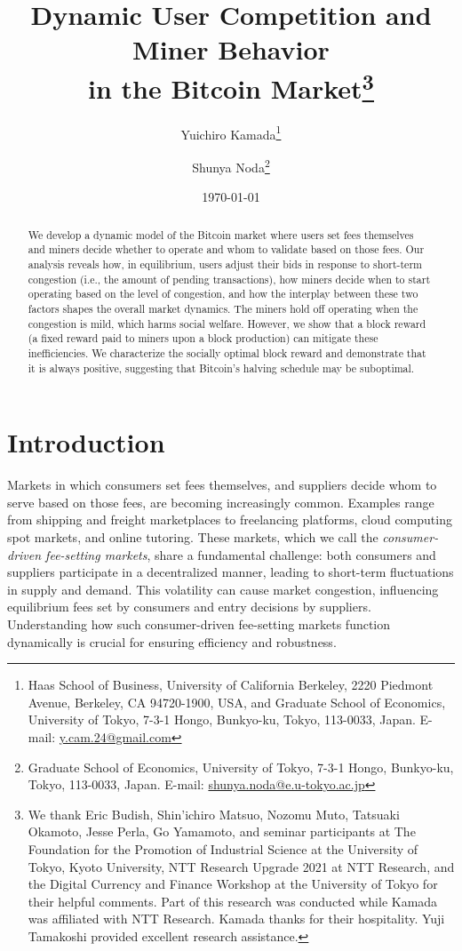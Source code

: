 \documentclass[12pt, letterpaper]{article}
\title{Dynamic User Competition and Miner Behavior\\ in the Bitcoin Market\thanks{We thank Eric Budish, Shin'ichiro Matsuo, Nozomu Muto, Tatsuaki Okamoto, Jesse Perla, Go Yamamoto, and seminar participants at 
The Foundation for the Promotion of Industrial Science at the University of Tokyo, Kyoto University, NTT Research Upgrade 2021 at NTT Research, and the Digital Currency and Finance Workshop at the University of Tokyo 
for their helpful comments. 
Part of this research was conducted while Kamada was affiliated with NTT Research. Kamada thanks for their hospitality. Yuji Tamakoshi provided excellent research assistance.}}
\date{\today}
\author{Yuichiro Kamada\footnote{Haas School of Business, University of California Berkeley, 2220 Piedmont Avenue, Berkeley, CA
94720-1900, USA, and Graduate School of Economics, University of Tokyo, 7-3-1 Hongo, Bunkyo-ku, Tokyo,
113-0033, Japan. E-mail: \href{mailto:y.cam.24@gmail.com}{y.cam.24@gmail.com}} \and Shunya Noda\footnote{Graduate School of Economics, University of Tokyo, 7-3-1 Hongo, Bunkyo-ku, Tokyo, 113-0033, Japan. E-mail: \href{mailto:shunya.noda@e.u-tokyo.ac.jp}{shunya.noda@e.u-tokyo.ac.jp}}}
\begin{document}
\onehalfspacing

\maketitle

\begin{abstract}
We develop a dynamic model of the Bitcoin market where users set fees themselves and miners decide whether to operate and whom to validate based on those fees. Our analysis reveals how, in equilibrium, users adjust their bids in response to short-term congestion (i.e., the amount of pending transactions), how miners decide when to start operating based on the level of congestion, and how the interplay between these two factors shapes the overall market dynamics. The miners hold off operating when the congestion is mild, which harms social welfare. However, we show that a block reward (a fixed reward paid to miners upon a block production) can mitigate these inefficiencies. We characterize the socially optimal block reward and demonstrate that it is always positive, suggesting that Bitcoin's halving schedule may be suboptimal.
\end{abstract}




\newpage

\section{Introduction}

Markets in which consumers set fees themselves, and suppliers decide whom to serve based on those fees, are becoming increasingly common. Examples range from shipping and freight marketplaces to freelancing platforms, cloud computing spot markets, and online tutoring. These markets, which we call the \textit{consumer-driven fee-setting markets}, share a fundamental challenge: both consumers and suppliers participate in a decentralized manner, leading to short-term fluctuations in supply and demand. This volatility can cause market congestion, influencing equilibrium fees set by consumers and entry decisions by suppliers. Understanding how such consumer-driven fee-setting markets function dynamically is crucial for ensuring efficiency and robustness.
\end{document}
